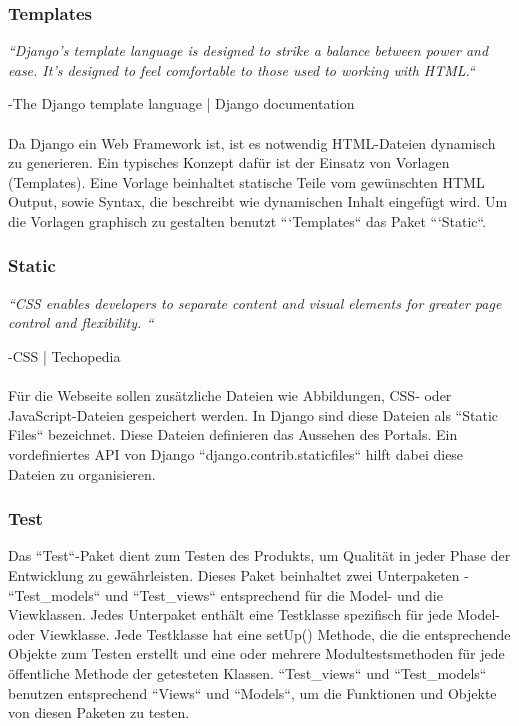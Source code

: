 \documentclass[parskip=full,11pt]{scrartcl}
\begin{document}
 \subsubsection*{Templates}
 \begin{center}
    \textit{``Django’s template language is designed to strike a balance between power and ease. It’s designed to feel comfortable to those used to working with HTML.``}
    \end{center}
    -The Django template language | Django documentation\\\\
Da Django ein Web Framework ist, ist es notwendig HTML-Dateien dynamisch zu generieren. Ein typisches Konzept dafür ist der Einsatz von Vorlagen (Templates). Eine Vorlage beinhaltet statische Teile vom gewünschten HTML Output, sowie Syntax, die beschreibt wie dynamischen Inhalt eingefügt wird. Um die Vorlagen graphisch zu gestalten benutzt ```Templates`` das Paket ```Static``.

 \subsubsection*{Static}
  \begin{center}
    \textit{``CSS enables developers to separate content and visual elements for greater page control and flexibility. ``}
    \end{center}
    -CSS | Techopedia\\\\
Für die Webseite sollen zusätzliche Dateien wie Abbildungen, CSS- oder JavaScript-Dateien gespeichert werden. In Django sind diese Dateien als ``Static Files`` bezeichnet. Diese Dateien definieren das Aussehen des Portals. Ein vordefiniertes API von Django ``django.contrib.staticfiles`` hilft dabei diese Dateien zu organisieren.
 
 \subsubsection*{Test}
Das ``Test``-Paket dient zum Testen des Produkts, um Qualität in jeder Phase der Entwicklung zu gewährleisten. Dieses Paket beinhaltet zwei Unterpaketen - ``Test{\_}models`` und ``Test{\_}views`` entsprechend für die Model- und die Viewklassen. Jedes Unterpaket enthält eine Testklasse spezifisch für jede Model- oder Viewklasse. Jede Testklasse hat eine setUp() Methode, die die entsprechende Objekte zum Testen erstellt und eine oder mehrere Modultestsmethoden für jede öffentliche Methode der getesteten Klassen.
``Test{\_}views`` und ``Test{\_}models`` benutzen entsprechend ``Views`` und ``Models``, um die Funktionen und Objekte von diesen Paketen zu testen. 
 
\end{document}
